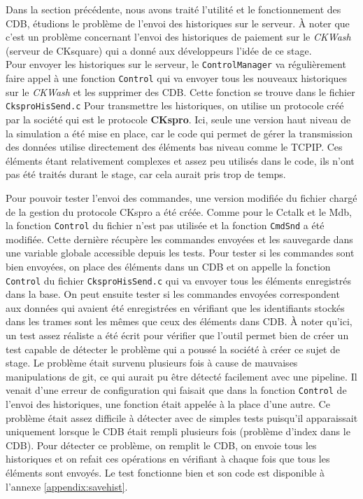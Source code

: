 \documentclass[a4paper]{article}
\begin{document}
Dans la section précédente, nous avons traité l'utilité et le fonctionnement des
CDB, étudions le problème de l'envoi des historiques sur le serveur. À noter que
c'est un problème  concernant l'envoi des historiques de paiement sur le
\textit{CKWash} (serveur de CKsquare) qui a donné aux développeurs l'idée de ce
stage.\\

Pour envoyer les historiques sur le serveur, le \verb|ControlManager| va
régulièrement faire appel à une fonction \verb|Control| qui va envoyer tous les nouveaux
historiques sur le \textit{CKWash} et les supprimer des CDB. Cette
fonction se trouve dans le fichier \verb|CksproHisSend.c| Pour transmettre les
historiques, on utilise un protocole créé par la société qui est le protocole
\textbf{CKspro}. Ici, seule une version haut niveau de la simulation a été mise
en place, car le code qui permet de gérer la transmission des données utilise
directement des éléments bas niveau comme le TCPIP. Ces éléments étant
relativement complexes et assez peu utilisés dans le code, ils n'ont pas été
traités durant le stage, car cela aurait pris trop de temps.

Pour pouvoir tester l'envoi des commandes, une version modifiée du fichier
chargé de la gestion du protocole CKspro a été créée. Comme pour le Cctalk et le
Mdb, la fonction \verb|Control| du fichier n'est pas utilisée et la fonction
\verb|CmdSnd| a été modifiée. Cette dernière récupère les commandes envoyées et
les sauvegarde dans une variable globale accessible depuis les tests. Pour
tester si les commandes sont bien envoyées, on place des éléments dans un CDB et
on appelle la fonction \verb|Control| du fichier \verb|CksproHisSend.c| qui va
envoyer tous les éléments enregistrés dans la base. On peut ensuite tester si
les commandes envoyées correspondent aux données qui avaient été enregistrées en
vérifiant que les identifiants stockés dans les trames sont les mêmes que ceux
des éléments dans CDB. À noter qu'ici, un test assez réaliste a été écrit pour
vérifier que l'outil permet bien de créer un test capable de détecter le
problème qui a poussé la société à créer ce sujet de stage. Le problème était
survenu plusieurs fois à cause de mauvaises manipulations de git, ce qui aurait
pu être détecté facilement avec une pipeline. Il venait d'une erreur de
configuration qui faisait que dans la fonction \verb|Control| de l'envoi des
historiques, une fonction était appelée à la place d'une autre. Ce problème
était assez difficile à détecter avec de simples tests puisqu'il apparaissait
uniquement lorsque le CDB était rempli plusieurs fois (problème d'index dans le
CDB). Pour détecter ce problème, on remplit le CDB, on envoie tous les
historiques et on refait ces opérations en vérifiant à chaque fois que tous les
éléments sont envoyés. Le test fonctionne bien et son code est disponible à
l'annexe \ref{appendix:savehist}.
\end{document}
